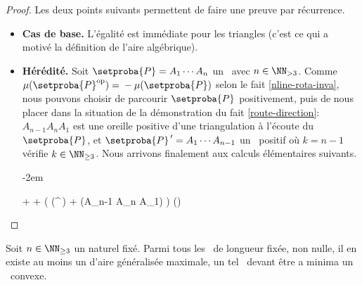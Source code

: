 \begin{proof}
    Les deux points suivants permettent de faire une preuve par récurrence.

    \begin{itemize}
		\item \textbf{Cas de base.}
		L'égalité est immédiate pour les triangles (c'est ce qui a motivé la définition de l'aire algébrique).


		\item \textbf{Hérédité.}
		Soit $\setproba{P} = A_1 \cdots A_n$ un \ngone\ avec $n \in \NN_{>3}$.
		Comme $\mu(\setproba{P}^{\mathrm{op}}) = {} - \mu(\setproba{P})$ selon le fait \ref{nline-rota-inva}, nous pouvons choisir de parcourir $\setproba{P}$ positivement, puis de nous placer dans la situation de la démonstration du fait \ref{route-direction}:
		$A_{n-1} A_n A_1$ est une oreille positive d'une triangulation à l'écoute du \ngone\ $\setproba{P}$, et $\setproba{P}^{\,\prime} = A_1 \cdots A_{n-1}$ un \kgone\ positif où $k = n-1$ vérifie $k \in \NN_{\geq3}$.
		Nous arrivons finalement aux calculs élémentaires suivants.
		
		\leavevmode\kern-2em%
		\begin{stepcalc}[style=ar*]
		          {}
		     + 
		          {}
		      +  
		          {}
		     \big( \mu(^{\,\prime}) + \mu(A_{n-1} A_n A_1) \big)
		          {}
		     \mu()
		          {}
		     
		\end{stepcalc}
    \end{itemize}
\end{proof}




\newpage %

\begin{fact} \label{suff-cond-ncycle}
    Soit $n \in \NN_{\geq3}$ un naturel fixé.
    Parmi tous les \ncycles\ de longueur fixée, non nulle, il en existe au moins un d'aire généralisée maximale, un tel \ncycle\ devant être a minima un \ngone\ convexe.
\end{fact}


